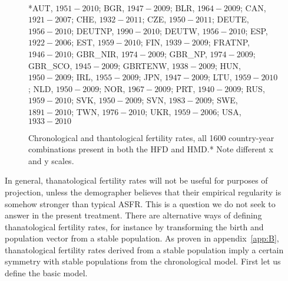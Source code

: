 \documentclass{article}
\begin{document}
\begin{figure}[h!]
	\caption{Chronological and thantological fertility rates, all 1600
	country-year combinations present in both the HFD and HMD.* Note different x
	and y scales.}
	\label{fig:Fxcompare}
	\begin{center}
	\\
	\end{center}
	\begin{tiny}
	*AUT, $1951-2010$; BGR, $1947-2009$; BLR, $1964-2009$; CAN, $1921-2007$; 
	CHE, $1932-2011$; CZE, $1950-2011$; DEUTE, $1956-2010$; DEUTNP, $1990-2010$; 
	DEUTW, $1956-2010$; ESP, $1922-2006$; EST, $1959-2010$; FIN, $1939-2009$; 
	FRATNP, $1946-2010$; GBR\_NIR, $1974-2009$; GBR\_NP, $1974-2009$; GBR\_SCO,
	$1945-2009$; GBRTENW, $1938-2009$; HUN, $1950-2009$; IRL, $1955-2009$; JPN, $1947-2009$; 
	LTU, $1959-2010$; NLD, $1950-2009$; NOR, $1967-2009$; PRT, $1940-2009$; 
	RUS, $1959-2010$; SVK, $1950-2009$; SVN, $1983-2009$; SWE, $1891-2010$; 
	TWN, $1976-2010$; UKR, $1959-2006$; USA, $1933-2010$
	\end{tiny}
\end{figure}

In general, thanatological fertility rates will not be useful for purposes of
projection, unless the demographer believes that their empirical regularity is
somehow stronger than typical ASFR. This is a question we do not seek to answer
in the present treatment. There are alternative ways of defining
thanatological fertility rates, for instance by transforming the birth and
population vector from a stable population. As proven in appendix~\ref{app:B},
thanatological fertility rates derived from a stable population imply a certain
symmetry with stable populations from the chronological model. First let us
define the basic model.

\FloatBarrier
\end{document}

